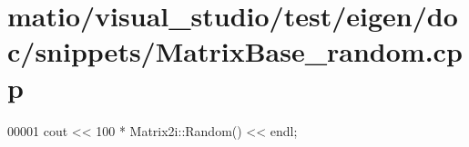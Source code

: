 \hypertarget{matio_2visual__studio_2test_2eigen_2doc_2snippets_2_matrix_base__random_8cpp_source}{}\section{matio/visual\+\_\+studio/test/eigen/doc/snippets/\+Matrix\+Base\+\_\+random.cpp}
\label{matio_2visual__studio_2test_2eigen_2doc_2snippets_2_matrix_base__random_8cpp_source}

\begin{DoxyCode}
00001 cout << 100 * Matrix2i::Random() << endl;
\end{DoxyCode}
